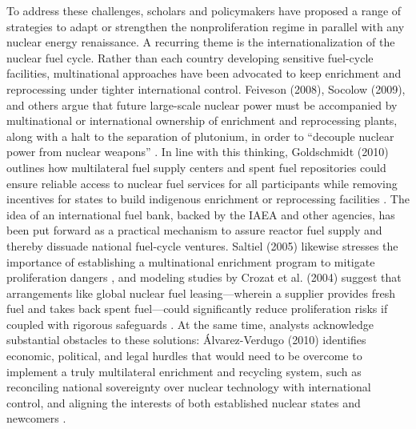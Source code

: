 \documentclass[11,5 pt]{article}
\begin{document}
To address these challenges, scholars and policymakers have proposed a range of strategies to adapt or strengthen the nonproliferation regime in parallel with any nuclear energy renaissance. A recurring theme is the internationalization of the nuclear fuel cycle. Rather than each country developing sensitive fuel-cycle facilities, multinational approaches have been advocated to keep enrichment and reprocessing under tighter international control. Feiveson (2008), Socolow (2009), and others argue that future large-scale nuclear power must be accompanied by multinational or international ownership of enrichment and reprocessing plants, along with a halt to the separation of plutonium, in order to “decouple nuclear power from nuclear weapons” \cite{10.2307/resrep05034} \cite{10.2307/40543999}. In line with this thinking, Goldschmidt (2010) outlines how multilateral fuel supply centers and spent fuel repositories could ensure reliable access to nuclear fuel services for all participants while removing incentives for states to build indigenous enrichment or reprocessing facilities \cite{goldschmidt2010multilateral}. The idea of an international fuel bank, backed by the IAEA and other agencies, has been put forward as a practical mechanism to assure reactor fuel supply and thereby dissuade national fuel-cycle ventures. Saltiel (2005) likewise stresses the importance of establishing a multinational enrichment program to mitigate proliferation dangers \cite{saltiel2005strengthening}, and modeling studies by Crozat et al. (2004) suggest that arrangements like global nuclear fuel leasing—wherein a supplier provides fresh fuel and takes back spent fuel—could significantly reduce proliferation risks if coupled with rigorous safeguards \cite{SpentFuelModel}. At the same time, analysts acknowledge substantial obstacles to these solutions: Álvarez-Verdugo (2010) identifies economic, political, and legal hurdles that would need to be overcome to implement a truly multilateral enrichment and recycling system, such as reconciling national sovereignty over nuclear technology with international control, and aligning the interests of both established nuclear states and newcomers \cite{Milagros}.
\end{document}
